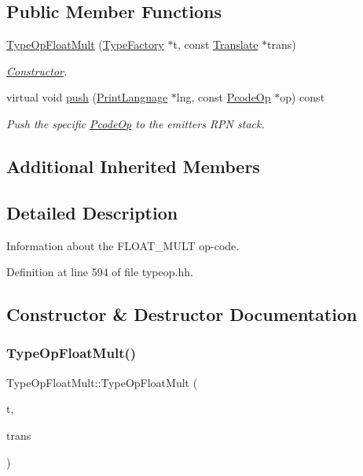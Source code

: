 \subsection*{Public Member Functions}
\begin{DoxyCompactItemize}
\item 
\mbox{\hyperlink{class_type_op_float_mult_abc122491e67d5391d35f0a82c35ff383}{Type\+Op\+Float\+Mult}} (\mbox{\hyperlink{class_type_factory}{Type\+Factory}} $\ast$t, const \mbox{\hyperlink{class_translate}{Translate}} $\ast$trans)
\begin{DoxyCompactList}\small\item\em \mbox{\hyperlink{class_constructor}{Constructor}}. \end{DoxyCompactList}\item 
virtual void \mbox{\hyperlink{class_type_op_float_mult_a23ffc0427d8f7e28b069084946a61f3f}{push}} (\mbox{\hyperlink{class_print_language}{Print\+Language}} $\ast$lng, const \mbox{\hyperlink{class_pcode_op}{Pcode\+Op}} $\ast$op) const
\begin{DoxyCompactList}\small\item\em Push the specific \mbox{\hyperlink{class_pcode_op}{Pcode\+Op}} to the emitter\textquotesingle{}s R\+PN stack. \end{DoxyCompactList}\end{DoxyCompactItemize}
\subsection*{Additional Inherited Members}


\subsection{Detailed Description}
Information about the F\+L\+O\+A\+T\+\_\+\+M\+U\+LT op-\/code. 

Definition at line 594 of file typeop.\+hh.



\subsection{Constructor \& Destructor Documentation}
\mbox{\label{class_type_op_float_mult_abc122491e67d5391d35f0a82c35ff383}} 
\subsubsection{\texorpdfstring{TypeOpFloatMult()}{TypeOpFloatMult()}}
{\footnotesize\ttfamily Type\+Op\+Float\+Mult\+::\+Type\+Op\+Float\+Mult (\begin{DoxyParamCaption}\item[{\mbox{\hyperlink{class_type_factory}{Type\+Factory}} $\ast$}]{t,  }\item[{const \mbox{\hyperlink{class_translate}{Translate}} $\ast$}]{trans }\end{DoxyParamCaption})}



